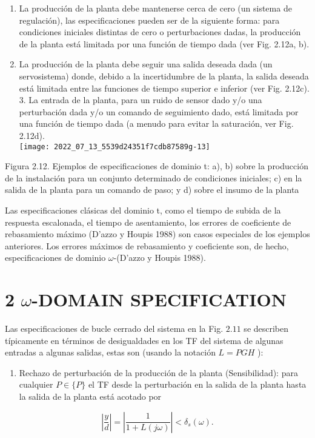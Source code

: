 \begin{enumerate}
  \item La producción de la planta debe mantenerse cerca de cero (un sistema de regulación), las especificaciones pueden ser de la siguiente forma: para condiciones iniciales distintas de cero o perturbaciones dadas, la producción de la planta está limitada por una función de tiempo dada (ver Fig. 2.12a, b).

  \item La producción de la planta debe seguir una salida deseada dada (un servosistema) donde, debido a la incertidumbre de la planta, la salida deseada está limitada entre las funciones de tiempo superior e inferior (ver Fig. 2.12c). 3. La entrada de la planta, para un ruido de sensor dado y/o una perturbación dada y/o un comando de seguimiento dado, está limitada por una función de tiempo dada (a menudo para evitar la saturación, ver Fig. 2.12d).\\

\texttt{[image: 2022\_07\_13\_5539d24351f7cdb87589g-13]}

\end{enumerate}
Figura 2.12. Ejemplos de especificaciones de dominio t: a), b) sobre la producción de la instalación para un conjunto determinado de condiciones iniciales; c) en la salida de la planta para un comando de paso; y d) sobre el insumo de la planta

Las especificaciones clásicas del dominio t, como el tiempo de subida de la respuesta escalonada, el tiempo de asentamiento, los errores de coeficiente de rebasamiento máximo (D'azzo y Houpis 1988) son casos especiales de los ejemplos anteriores. Los errores máximos de rebasamiento y coeficiente son, de hecho, especificaciones de dominio $\omega$-(D'azzo y Houpis 1988).

\section{2 $\omega$-DOMAIN SPECIFICATION}
Las especificaciones de bucle cerrado del sistema en la Fig. $2.11$ se describen típicamente en términos de desigualdades en los TF del sistema de algunas entradas a algunas salidas, estas son (usando la notación $L=P G H$ ):

\begin{enumerate}
  \item Rechazo de perturbación de la producción de la planta (Sensibilidad): para cualquier $P \in\{P\}$ el TF desde la perturbación en la salida de la planta hasta la salida de la planta está acotado por
\end{enumerate}
$$
\left|\frac{y}{d}\right|=\left|\frac{1}{1+L(j \omega)}\right|<\delta_{s}(\omega) .
$$

